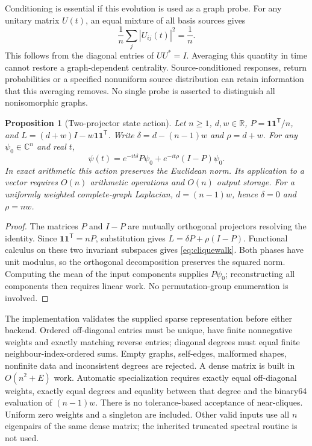 \documentclass[11pt,a4paper]{article}
\newtheorem{proposition}[theorem]{Proposition}
\theoremstyle{definition}\newtheorem{definition}[theorem]{Definition}
\newcommand{\R}{\mathbb{R}}
\begin{document}
Conditioning is essential if this evolution is used as a graph probe. For
any unitary matrix $U(t)$, an equal mixture of all basis sources gives
\[
 \frac1n\sum_j |U_{ij}(t)|^2=\frac1n.
\]
This follows from the diagonal entries of $UU^*=I$. Averaging this quantity
in time cannot restore a graph-dependent centrality. Source-conditioned
responses, return probabilities or a specified nonuniform source distribution
can retain information that this averaging removes. No single probe is asserted
to distinguish all nonisomorphic graphs.

\begin{proposition}[Two-projector state action]\label{prop:cliquewalk}
Let $n\geq1$, $d,w\in\R$, $P=\boldsymbol{1}\boldsymbol{1}^{\mathsf T}/n$,
and $L=(d+w)I-w\boldsymbol{1}\boldsymbol{1}^{\mathsf T}$. Write
$\delta=d-(n-1)w$ and $\rho=d+w$. For any $\psi_0\in\mathbb C^n$ and real $t$,
\begin{equation}\label{eq:cliquewalk}
 \psi(t)=e^{-it\delta}P\psi_0+e^{-it\rho}(I-P)\psi_0.
\end{equation}
In exact arithmetic this action preserves the Euclidean norm. Its application
to a vector requires $O(n)$ arithmetic operations and $O(n)$ output storage.
For a uniformly weighted complete-graph Laplacian, $d=(n-1)w$, hence
$\delta=0$ and $\rho=nw$.
\end{proposition}
\begin{proof}
The matrices $P$ and $I-P$ are mutually orthogonal projectors resolving the
identity. Since $\boldsymbol{1}\boldsymbol{1}^{\mathsf T}=nP$, substitution
gives $L=\delta P+\rho(I-P)$. Functional calculus on these two invariant
subspaces gives \eqref{eq:cliquewalk}. Both phases have unit modulus, so the
orthogonal decomposition preserves the squared norm. Computing the mean of
the input components supplies $P\psi_0$; reconstructing all components then
requires linear work. No permutation-group enumeration is involved.
\end{proof}

The implementation validates the supplied sparse representation before either
backend. Ordered off-diagonal entries must be unique, have finite nonnegative
weights and exactly matching reverse entries; diagonal degrees must equal
finite neighbour-index-ordered sums. Empty graphs, self-edges, malformed shapes,
nonfinite data and inconsistent degrees are rejected. A dense matrix is built
in $O(n^2+E)$ work. Automatic specialization requires exactly equal off-diagonal
weights, exactly equal degrees and equality between that degree and the
binary64 evaluation of $(n-1)w$. There is no tolerance-based acceptance of
near-cliques. Uniform zero weights and a singleton are included. Other valid
inputs use all $n$ eigenpairs of the same dense matrix; the inherited truncated
spectral routine is not used.
\end{document}

